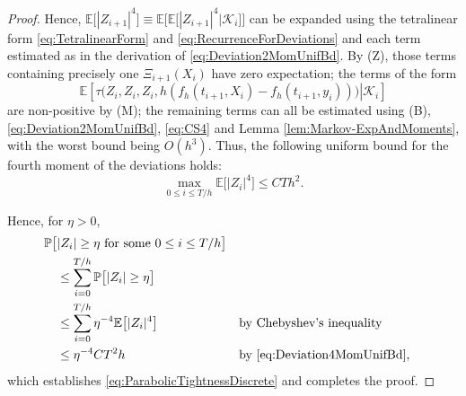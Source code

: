 \documentclass[reqno]{amsart}
\theoremstyle{definition}
\begin{document}
\begin{proof}
	Hence, ${\mathbb{E}} \big[ | Z_{i + 1} |^{4} \big] \equiv {\mathbb{E}} \big[ {\mathbb{E}} \big[ | Z_{i + 1} |^{4} \big| \mathcal{K}_{i} \big] \big]$ can be expanded using the tetralinear form \eqref{eq:TetralinearForm} and \eqref{eq:RecurrenceForDeviations} and each term estimated as in the derivation of \eqref{eq:Deviation2MomUnifBd}.  By (Z), those terms containing precisely one $\Xi_{i + 1} (X_{i})$ have zero expectation; the terms of the form
	\[
		{\mathbb{E}} \left[ \left. \tau \big( Z_{i}, Z_{i}, Z_{i}, h (f_{h} (t_{i + 1}, X_{i}) - f_{h} (t_{i + 1}, y_{i})) \big) \right| \mathcal{K}_{i} \right]
	\]
	are non-positive by (M); the remaining terms can all be estimated using (B), \eqref{eq:Deviation2MomUnifBd}, \eqref{eq:CS4} and Lemma \ref{lem:Markov-ExpAndMoments}, with the worst bound being $O(h^{3})$. Thus, the following uniform bound for the fourth moment of the deviations holds:
	\begin{equation}
		\label{eq:Deviation4MomUnifBd} 		\max_{0 \leq i \leq T / h} {\mathbb{E}} \big[ | Z_{i} |^{4} \big] \leq C T h^{2}.
	\end{equation}

	Hence, for $\eta > 0$,
	\begin{align*}
		& \mathbb{P} \big[ | Z_{i} | \geq \eta \text{ for some } 0 \leq i \leq T / h \big] \\
		& \quad \leq \sum_{i = 0}^{T / h} \mathbb{P} \big[ | Z_{i} | \geq \eta \big] \\
		& \quad \leq \sum_{i = 0}^{T / h} \eta^{-4} {\mathbb{E}} \big[ | Z_{i} |^{4} \big] && \text{by Chebyshev's inequality} \\
		& \quad \leq \eta^{-4} C T^{2} h && \text{by \eqref{eq:Deviation4MomUnifBd},}
	\end{align*}
	which establishes \eqref{eq:ParabolicTightnessDiscrete} and completes the proof.
\end{proof}



\end{document}
